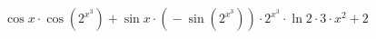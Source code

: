 \documentclass{article}
\begin{document}
       

\[{{{\cos x }\cdot{\cos({ 2 }^{{ x }^{ 3 }})}}+{{\sin x }\cdot{{({}-{\sin({ 2 }^{{ x }^{ 3 }})})}\cdot{{{ 2 }^{{ x }^{ 3 }}}\cdot{{\ln 2 }\cdot{{ 3 }\cdot{{ x }^{ 2 }}}}}}}}+{ 2 }\]
\end{document}
